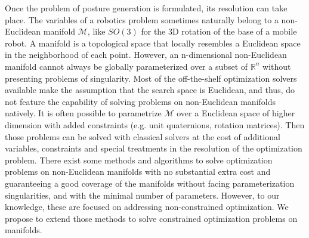 
Once the problem of posture generation is formulated, its resolution can take place.
The variables of a robotics problem sometimes naturally belong to a non-Euclidean manifold $\mathcal{M}$, like $SO(3)$ for the 3D rotation of the base of a mobile robot.
A manifold is a topological space that locally resembles a Euclidean space in the neighborhood of each point.
However, an n-dimensional non-Euclidean manifold cannot always be globally parameterized over a subset of $\mathbb{R}^n$ without presenting problems of singularity.
Most of the off-the-shelf optimization solvers available make the assumption that the search space is Euclidean, and thus, do not feature the capability of solving problems on non-Euclidean manifolds natively.
It is often possible to parametrize $\mathcal{M}$ over a Euclidean space of higher dimension with added constraints (e.g. unit quaternions, rotation matrices).
Then those problems can be solved with classical solvers at the cost of additional variables, constraints and special treatments in the resolution of the optimization problem.
There exist some methods and algorithms to solve optimization problems on non-Euclidean manifolds with no substantial extra cost and guaranteeing a good coverage of the manifolds without facing parameterization singularities, and with the minimal number of parameters.
However, to our knowledge, these are focused on addressing non-constrained optimization.
We propose to extend those methods to solve constrained optimization problems on manifolds.

